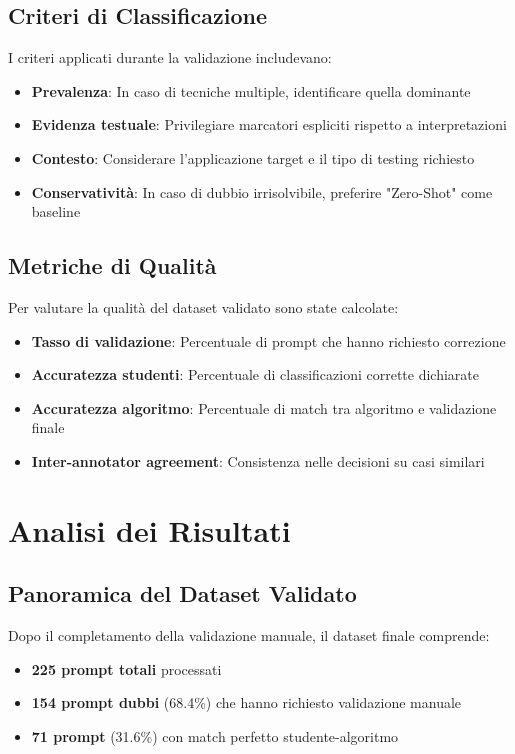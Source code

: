 \documentclass[a4paper,12pt]{article}
\begin{document}
\subsection{Criteri di Classificazione}
I criteri applicati durante la validazione includevano:

\begin{itemize}
    \item \textbf{Prevalenza}: In caso di tecniche multiple, identificare quella dominante
    \item \textbf{Evidenza testuale}: Privilegiare marcatori espliciti rispetto a interpretazioni
    \item \textbf{Contesto}: Considerare l'applicazione target e il tipo di testing richiesto
    \item \textbf{Conservatività}: In caso di dubbio irrisolvibile, preferire "Zero-Shot" come baseline
\end{itemize}

\subsection{Metriche di Qualità}
Per valutare la qualità del dataset validato sono state calcolate:

\begin{itemize}
    \item \textbf{Tasso di validazione}: Percentuale di prompt che hanno richiesto correzione
    \item \textbf{Accuratezza studenti}: Percentuale di classificazioni corrette dichiarate
    \item \textbf{Accuratezza algoritmo}: Percentuale di match tra algoritmo e validazione finale
    \item \textbf{Inter-annotator agreement}: Consistenza nelle decisioni su casi similari
\end{itemize}

\section{Analisi dei Risultati}

\subsection{Panoramica del Dataset Validato}
Dopo il completamento della validazione manuale, il dataset finale comprende:

\begin{itemize}
    \item \textbf{225 prompt totali} processati
    \item \textbf{154 prompt dubbi} (68.4\%) che hanno richiesto validazione manuale
    \item \textbf{71 prompt} (31.6\%) con match perfetto studente-algoritmo
\end{itemize}
\end{document}
